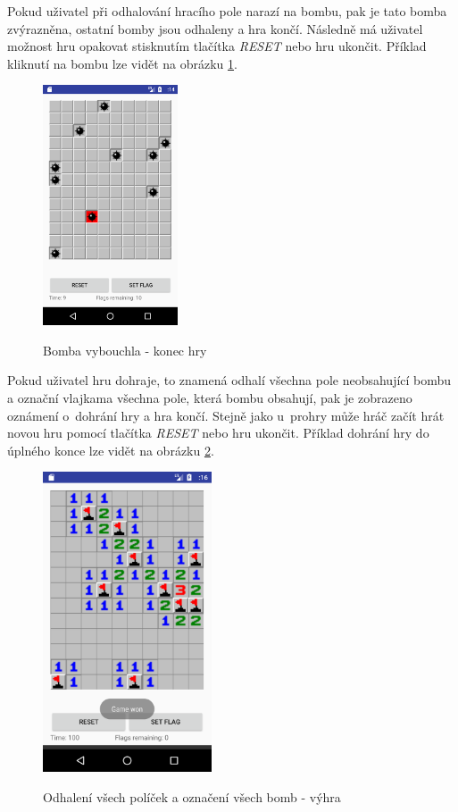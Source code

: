 \documentclass[12pt, a4paper]{article}
\begin{document}
\par
Pokud uživatel při odhalování hracího pole narazí na bombu, pak je tato bomba zvýrazněna, ostatní bomby jsou odhaleny a hra končí. Následně má uživatel možnost hru opakovat stisknutím tlačítka \textit{RESET} nebo hru ukončit. Příklad kliknutí na bombu lze vidět na obrázku \ref{fig:prohra}.
	\begin{figure}[h!]
	\centering
	\includegraphics[width=4cm]{img/prohra}\\
	\caption{Bomba vybouchla - konec hry}
	\label{fig:prohra}
	\end{figure}
\par
Pokud uživatel hru dohraje, to znamená odhalí všechna pole neobsahující bombu a označní vlajkama všechna pole, která bombu obsahují, pak je zobrazeno oznámení o~dohrání hry a hra končí. Stejně jako u~prohry může hráč začít hrát novou hru pomocí tlačítka \textit{RESET} nebo hru ukončit. Příklad dohrání hry do úplného konce lze vidět na obrázku \ref{fig:vyhra}.
	\begin{figure}[h!]
	\centering
	\includegraphics[width=5cm]{img/vyhra}\\
	\caption{Odhalení všech políček a označení všech bomb - výhra}
	\label{fig:vyhra}
	\end{figure}
\newpage
\end{document}
